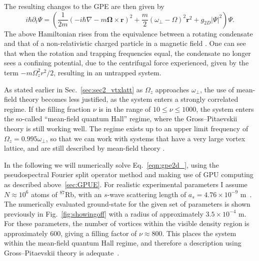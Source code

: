 The resulting changes to the GPE are then given by
\begin{equation}\label{eqn:vector_potential_gpe}
    i\hbar\partial_t \Psi =
    \left(\frac{1}{2m}(-i\hbar\nabla - m\boldsymbol{\Omega}\times\mathbf{r})^2 + \frac{m}{2}(\omega_\perp - \Omega)^2\mathbf{r}^2 + g_{2D}|\Psi|^2 \right)\Psi.
\end{equation}
The above Hamiltonian rises from the equivalence between a rotating condensate and that of a non-relativistic charged particle in a magnetic field \cite{Vtx:Mueller_prl_2002}.
One can see that when the rotation and trapping frequencies equal, the condensate no longer sees a confining potential, due to the centrifugal force experienced, given by the term $-m\Omega_z^2r^2/2$, resulting in an untrapped system.

As stated earlier in Sec.~\ref{sec:sec2_vtxlatt} as $\Omega_z$ approaches $\omega_\perp$, the use of mean-field theory becomes less justified, as the system enters a strongly correlated regime. If the filling fraction $\nu$ is in the range of $10 \leq \nu \leq 1000$, the system enters the so-called ``mean-field quantum Hall'' regime, where the Gross--Pitaevskii theory is still working well. The regime exists up to an upper limit frequency of $\Omega_z = 0.995\omega_\perp$, so that we can work with systems that have a very large vortex lattice, and are still described by mean-field theory \cite{BEC:Fetter_revmodphys_2009}.

In the following we will numerically solve Eq.~\eqref{eqn:gpe2d_}, using the pseudospectral Fourier split operator method and making use of GPU computing as described above~\ref{sec:GPUE}. For realistic experimental parameters I assume  $N\approx 10^6$ atoms of $^{87}$Rb, with an $s$-wave scattering length of $a_s=4.76\times10^{-9}$ m~\cite{AO:Roberts_prl_1998}. The numerically evaluated ground-state for the given set of parameters is shown previously in Fig.~\ref{fig:showingoff} with a radius of approximately $3.5\times 10^{-4}$ m. For these parameters, the number of vortices within the visible density region is approximately 600, giving a filling factor of $\nu \approx 800 $. This places the system within the mean-field quantum Hall regime, and therefore a description using Gross--Pitaevskii theory is adequate~\cite{Vtx:Schweikhard_prl_2004}.

